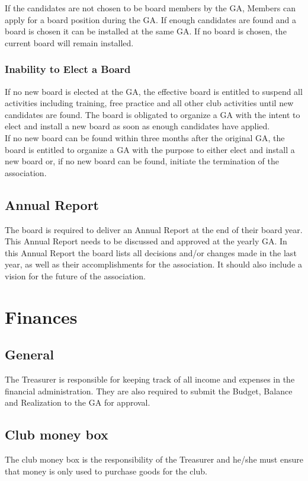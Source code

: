 \documentclass[a4paper]{article}
\newcommand{\Ajv}{Annual Report} %
\begin{document}
If the candidates are not chosen to be board members by the { GA}, { Members} can apply for a board position during the { GA}. If enough candidates are found and a board is chosen it can be installed at the same { GA}. If no board is chosen, the current board will remain installed.

\subsubsection{Inability to Elect a Board}

If no new board is elected at the { GA}, the effective board is entitled to suspend all activities including training, free practice and all other club activities until new candidates are found. The board is obligated to organize a { GA} with the intent to elect and install a new board as soon as enough candidates have applied. \\

If no new board can be found within three months after the original { GA}, the board is entitled to organize a { GA} with the purpose to either elect and install a new board or, if no new board can be found, initiate the termination of the association.

\subsection{\Ajv}
The board is required to deliver an { \Ajv} at the end of their board year. This { \Ajv} needs to be discussed and approved at the yearly { GA}. In this { \Ajv} the board lists all decisions and/or changes made in the last year, as well as their accomplishments for the association. It should also include a vision for the future of the association.

\section{Finances}
\subsection{General}
The Treasurer is responsible for keeping track of all income and expenses in the financial administration. They are also required to submit the Budget, Balance and Realization to the { GA} for approval.

\subsection{Club money box}
The club money box is the responsibility of the Treasurer and he/she must ensure that money is only used to purchase goods for the club.
\end{document}
